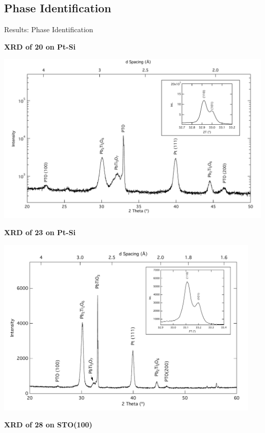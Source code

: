 \documentclass[professionalfont]{beamer}
\begin{document}
\subsection{Phase Identification}
\begin{frame}{Results: Phase Identification}
\begin{overprint}
		\begin{center}
		\textbf{\Large XRD of 20 on Pt-Si}\vspace{0.25cm}
		\centerline{\includegraphics[width=\textwidth]{./graphics/data/xrd/20Pt}}
		\end{center}
		\begin{center}
		\textbf{\Large XRD of 23 on Pt-Si}
		\centerline{\includegraphics[width=0.95\textwidth]{./graphics/data/xrd/23Pt}}
		\end{center}
		\begin{center}
		\textbf{\Large XRD of 28 on STO(100)}

\end{center}
\end{overprint}
\end{frame}
\end{document}
